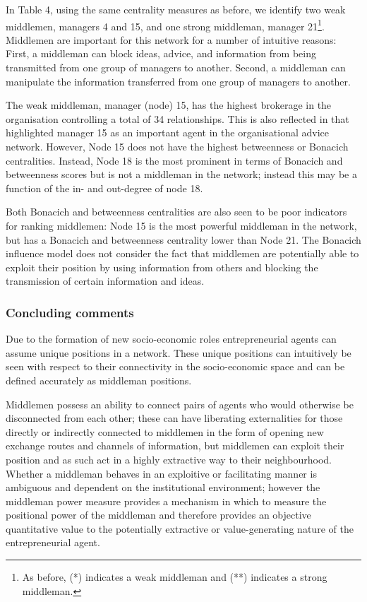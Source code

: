 \documentclass[11pt,fleqn]{article}
\begin{document}
In Table 4, using the same centrality measures as before, we identify two weak middlemen, managers 4 and 15, and one strong middleman, manager 21\footnote{As before, (*) indicates a weak middleman and (**) indicates a strong middleman.}. Middlemen are important for this network for a number of intuitive reasons: First, a middleman can block ideas, advice, and information from being transmitted from one group of managers to another. Second, a middleman can manipulate the information transferred from one group of managers to another.

The weak middleman, manager (node) 15, has the highest brokerage in the organisation controlling a total of 34 relationships. This is also reflected in that \citet{Krackhardt1987} highlighted manager 15 as an important agent in the organisational advice network. However, Node 15 does not have the highest betweenness or Bonacich centralities. Instead, Node 18 is the most prominent in terms of Bonacich and betweenness scores but is not a middleman in the network; instead this may be a function of the in- and out-degree of node 18.

Both Bonacich and betweenness centralities are also seen to be poor indicators for ranking middlemen: Node 15 is the most powerful middleman in the network, but has a Bonacich and betweenness centrality lower than Node 21. The Bonacich influence model does not consider the fact that middlemen are potentially able to exploit their position by using information from others and blocking the transmission of certain information and ideas.

\subsubsection{Concluding comments}

Due to the formation of new socio-economic roles entrepreneurial agents can assume unique positions in a network. These unique positions can intuitively be seen with respect to their connectivity in the socio-economic space and can be defined accurately as middleman positions. 

Middlemen possess an ability to connect pairs of agents who would otherwise be disconnected from each other; these can have liberating externalities for those directly or indirectly connected to middlemen in the form of opening new exchange routes and channels of information, but middlemen can exploit their position and as such act in a highly extractive way to their neighbourhood. Whether a middleman behaves in an exploitive or facilitating manner is ambiguous and dependent on the institutional environment; however the middleman power measure provides a mechanism in which to measure the positional power of the middleman and therefore provides an objective quantitative value to the potentially extractive or value-generating nature of the entrepreneurial agent.
\end{document}
